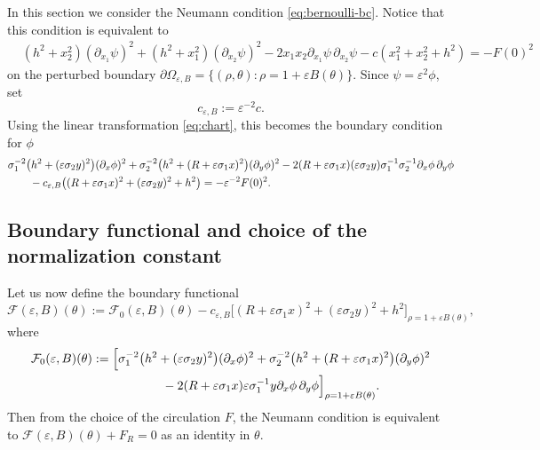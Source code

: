 \documentclass[12pt,reqno]{amsart}
\numberwithin{equation}{section}
\theoremstyle{definition}
\theoremstyle{remark}
\begin{document}
In this section we  consider the Neumann condition \eqref{eq:bernoulli-bc}. 
Notice that this  condition  is equivalent to
\begin{align}\label{eq:Bernoulli-expanded}
&(h^2+x_2^2)(\partial_{x_1}\psi)^2+(h^2+x_1^2)(\partial_{x_2}\psi)^2
-2x_1x_2\partial_{x_1}\psi\,\partial_{x_2}\psi
-c(x_1^2+x_2^2+h^2)=-F(0)^2
\end{align}
on the perturbed boundary $ \partial\varOmega_{\varepsilon, B}=\{(\rho,\theta):\rho=1+\varepsilon B(\theta)\} $.  Since $\psi=\varepsilon^2\phi$, set
\begin{equation*}%
c_{\varepsilon,B}:=\varepsilon^{-2}c.
\end{equation*}
Using the linear transformation \eqref{eq:chart}, this becomes the boundary condition for $ \phi $
\begin{align*}%
&\sigma_1^{-2}\bigl(h^2+(\varepsilon\sigma_2y)^2\bigr)(\partial_x\phi)^2
+\sigma_2^{-2}\bigl(h^2+(R+\varepsilon\sigma_1x)^2\bigr)(\partial_y\phi)^2
-2(R+\varepsilon\sigma_1x)(\varepsilon\sigma_2y)\sigma_1^{-1}\sigma_2^{-1}\partial_x\phi\,\partial_y\phi\notag\\
&\qquad -c_{\varepsilon,B}\bigl((R+\varepsilon\sigma_1x)^2+(\varepsilon\sigma_2y)^2+h^2\bigr)
=-\varepsilon^{-2}F(0)^2.
\end{align*}
\subsection{Boundary functional and choice of the normalization constant}
Let us now define the boundary functional
\begin{equation}\label{eq:Fboundary}
\mathcal F(\varepsilon,B) (\theta):={}\mathcal F_0(\varepsilon,B) (\theta)- c_{\varepsilon,B}\Big[(R+\varepsilon\sigma_1x)^2+(\varepsilon\sigma_2y)^2+h^2\Big]_{\rho=1+\varepsilon B(\theta)},
\end{equation}
where
\begin{align*}%
\mathcal F_0(\varepsilon,B) (\theta):={}&\Big[\sigma_1^{-2}\bigl(h^2+(\varepsilon\sigma_2y)^2\bigr)(\partial_x\phi)^2
+\sigma_2^{-2}\bigl(h^2+(R+\varepsilon\sigma_1x)^2\bigr)(\partial_y\phi)^2\notag\\
&\hspace{4em}-2(R+\varepsilon\sigma_1x)\varepsilon\sigma_1^{-1}y\partial_x\phi\,\partial_y\phi\Big]_{\rho=1+\varepsilon B(\theta)}.
\end{align*}
Then from the choice of the circulation $ F $, the Neumann condition is equivalent to $ \mathcal F (\varepsilon,B)(\theta)+F_R=0 $ as an identity in $\theta$.
\end{document}
